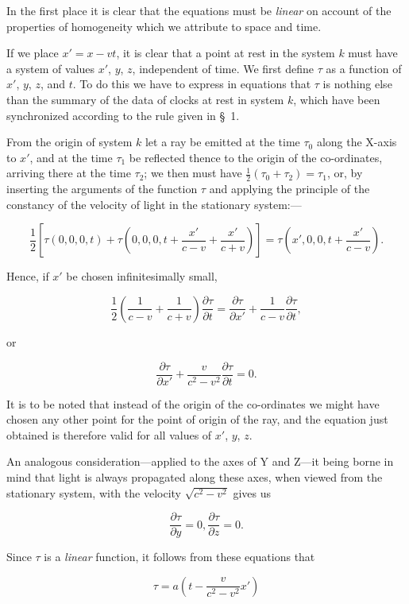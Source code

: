 \documentclass{article}
\begin{document}
In the first place it is clear that the equations must be {\em linear} on
account of the properties of homogeneity which we attribute to space
and time.

If we place $x'=x-vt$, it is clear that a point at rest in the
system $k$ must have a system of values $x'$, $y$, $z$, independent of time.
We first define $\tau$ as a function of $x'$, $y$, $z$, and $t$.  To do this we
have to express in equations that $\tau$ is nothing else than the summary
of the data of clocks at rest in system $k$, which have been
synchronized according to the rule given in \S\ 1.

From the origin of
system $k$ let a ray be emitted at the time $\tau_0$ along the X-axis to $x'$,
and at the time $\tau_1$ be reflected thence to the origin of the
co-ordinates, arriving there at the time $\tau_2$; we then must have
$\frac{1}{2}(\tau_0+\tau_2)=\tau_1$, or,
by inserting the arguments of the function $\tau$ and
applying the principle of the constancy of the velocity of light in
the stationary system:---

\[
\frac{1}{2}\left[\tau(0,0,0,t)+\tau\left(0,0,0,t+\frac{x'}{c-v}+\frac{x'}{c+v}\right)\right]=
\tau\left(x',0,0,t+\frac{x'}{c-v}\right).
\]

\noindent
Hence, if $x'$ be chosen infinitesimally small,

\[
\frac{1}{2}\left(\frac{1}{c-v}+\frac{1}{c+v}\right)\frac{\partial
\tau}{\partial t}=\frac{\partial\tau}{\partial
x'}+\frac{1}{c-v}\frac{\partial\tau}{\partial t},
\]

\noindent
or

\[
\frac{\partial\tau}{\partial
x'}+\frac{v}{c^2-v^2}\frac{\partial\tau}{\partial t}=0.
\]

It is to be noted that instead of the origin of the co-ordinates we
might have chosen any other point for the point of origin of the ray,
and the equation just obtained is therefore valid for all values of
$x'$, $y$, $z$.

An analogous consideration---applied to the axes of Y and Z---it being
borne in mind that light is always propagated along these axes, when
viewed from the stationary system, with the velocity
$\sqrt{c^2-v^2}$
gives us
  
\[
\frac{\partial\tau}{\partial y}=0, \frac{\partial\tau}{\partial z}=0.
\]

\noindent
Since $\tau$ is a {\em linear} function, it follows from these equations that

\[
\tau=a\left(t-\frac{v}{c^2-v^2}x'\right)
\]
\end{document}
